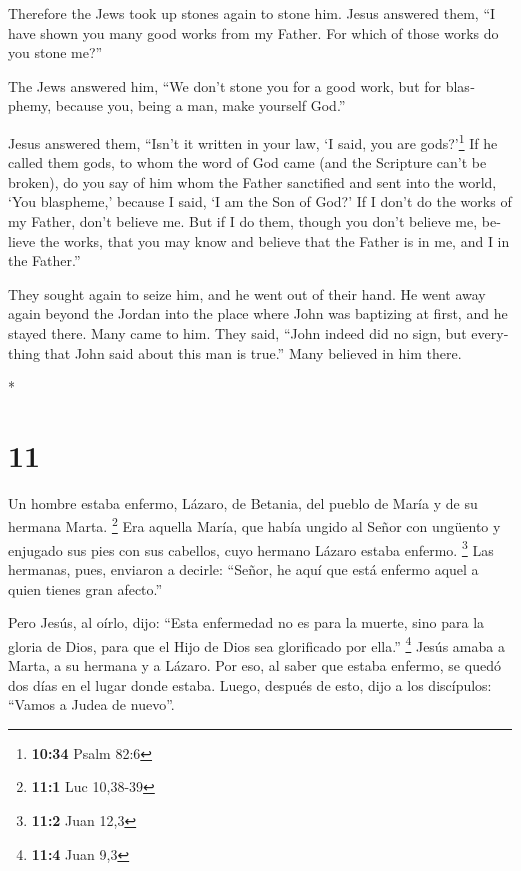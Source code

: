 \begin{paracol}{2}
\begin{otherlanguage}{english}
 Therefore the Jews took up stones again to stone him.
 Jesus answered them, ``I have shown you many good works
from my Father. For which of those works do you stone me?''

 The Jews answered him, ``We don't stone you for a good
work, but for blasphemy, because you, being a man, make yourself God.''

 Jesus answered them, ``Isn't it written in your law, `I
said, you are gods?'\footnote{\textbf{10:34} Psalm 82:6} 
If he called them gods, to whom the word of God came (and the Scripture
can't be broken),  do you say of him whom the Father
sanctified and sent into the world, `You blaspheme,' because I said, `I
am the Son of God?'  If I don't do the works of my
Father, don't believe me.  But if I do them, though you
don't believe me, believe the works, that you may know and believe that
the Father is in me, and I in the Father.''

 They sought again to seize him, and he went out of their
hand.  He went away again beyond the Jordan into the
place where John was baptizing at first, and he stayed there.
 Many came to him. They said, ``John indeed did no sign,
but everything that John said about this man is true.'' 
Many believed in him there.

\end{otherlanguage}

\switchcolumn[0]*

\hypertarget{section-20}{%
\section{11}\label{section-20}}

 Un hombre estaba enfermo, Lázaro, de Betania, del pueblo
de María y de su hermana Marta. \footnote{\textbf{11:1} Luc 10,38-39}
 Era aquella María, que había ungido al Señor con ungüento
y enjugado sus pies con sus cabellos, cuyo hermano Lázaro estaba
enfermo. \footnote{\textbf{11:2} Juan 12,3}  Las hermanas,
pues, enviaron a decirle: ``Señor, he aquí que está enfermo aquel a
quien tienes gran afecto.''

 Pero Jesús, al oírlo, dijo: ``Esta enfermedad no es para
la muerte, sino para la gloria de Dios, para que el Hijo de Dios sea
glorificado por ella.'' \footnote{\textbf{11:4} Juan 9,3} 
Jesús amaba a Marta, a su hermana y a Lázaro.  Por eso, al
saber que estaba enfermo, se quedó dos días en el lugar donde estaba.
 Luego, después de esto, dijo a los discípulos: ``Vamos a
Judea de nuevo''.


\end{paracol}
